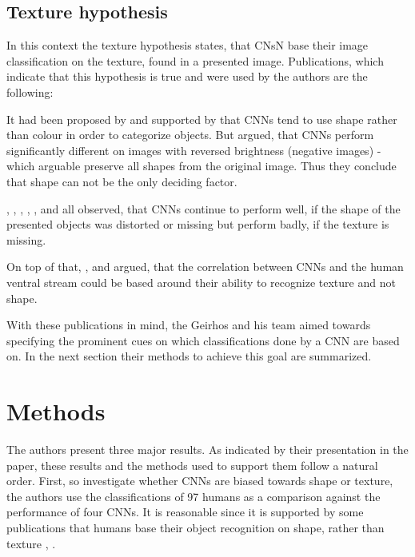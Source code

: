 \documentclass[runningheads,a4paper]{llncs}
\begin{document}
\subsection{Texture hypothesis}
In this context the texture hypothesis states, that CNsN base their image classification on the texture, found in a presented image.  Publications, which indicate that this hypothesis is true and were used by the authors are the following:

It had been proposed by \citep{ritter2017cognitive} and supported by \citep{geirhos2018generalisation} that CNNs tend to use shape rather than colour in order to categorize objects. But \citep{hosseini2018assessingo} argued, that CNNs perform significantly different on images with reversed brightness (negative images) - which arguable preserve all shapes from the original image. Thus they conclude that shape can not be the only deciding factor.

\citep{gatys2015texture}, \citep{gatys2017controlling}, \citep{brendel2019approximating}, \citep{ballester2016performance}, \citep{funke2017synthesising}, \citep{ballester2016performance} and \citep{eckstein2017beyond} all observed, that CNNs continue to perform well, if the shape of the presented objects was distorted or missing but perform badly, if the texture is missing.

On top of that, \citep{wallis2017parametric}, \citep{laskar2018correspondence} and\citep{long2018role} argued, that the correlation between CNNs and the human ventral stream could be based around their ability to recognize texture and not shape.

With these publications in mind, the Geirhos and his team aimed towards specifying the prominent cues on which classifications done by a CNN are based on. In the next section their methods to achieve this goal are summarized.

\section{Methods}
The authors present three major results. As indicated by their presentation in the paper, these results and the methods used to support them follow a natural order. First, so investigate whether CNNs are biased towards shape or texture, the authors use the classifications of 97 humans as a comparison against the performance of four CNNs. It is reasonable since it is supported by some publications that humans base their object recognition on shape, rather than texture \citep{ritter2017cognitive}, \citep{landau1988importance}.\\
\end{document}
